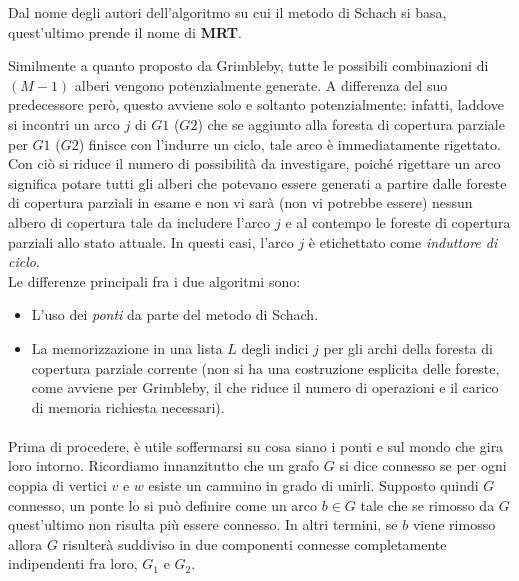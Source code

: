Dal nome degli autori dell'algoritmo su cui il metodo di Schach si basa, quest'ultimo prende il nome di \textbf{MRT}.

Similmente a quanto proposto da Grimbleby, tutte le possibili combinazioni di $(M-1)$ alberi vengono potenzialmente generate. A differenza del suo predecessore però, questo avviene solo e soltanto potenzialmente: infatti, laddove si incontri un arco $j$ di $G1$ ($G2$) che se aggiunto alla foresta di copertura parziale per $G1$ ($G2$) finisce con l'indurre un ciclo, tale arco è immediatamente rigettato. Con ciò si riduce il numero di possibilità da investigare, poiché rigettare un arco significa potare tutti gli alberi che potevano essere generati a partire dalle foreste di copertura parziali in esame e non vi sarà (non vi potrebbe essere) nessun albero di copertura tale da includere l'arco $j$ e al contempo le foreste di copertura parziali allo stato attuale. In questi casi, l'arco $j$ è etichettato come \textit{induttore di ciclo}.\\
Le differenze principali fra i due algoritmi sono:
\begin{itemize}
 \item L'uso dei \textit{ponti} da parte del metodo di Schach.
 \item La memorizzazione in una lista $L$ degli indici $j$ per gli archi della foresta di copertura parziale corrente (non si ha una costruzione esplicita delle foreste, come avviene per Grimbleby, il che riduce il numero di operazioni e il carico di memoria richiesta necessari).
\end{itemize}

\paragraph{}
Prima di procedere, è utile soffermarsi su cosa siano i ponti e sul mondo che gira loro intorno. Ricordiamo innanzitutto che un grafo $G$ si dice connesso se per ogni coppia di vertici $v$ e $w$ esiste un cammino in grado di unirli. Supposto quindi $G$ connesso, un ponte lo si può definire come un arco $b \in G$ tale che se rimosso da $G$ quest'ultimo non risulta più essere connesso. In altri termini, se $b$ viene rimosso allora $G$ risulterà suddiviso in due componenti connesse completamente indipendenti fra loro, $G_1$ e $G_2$.

